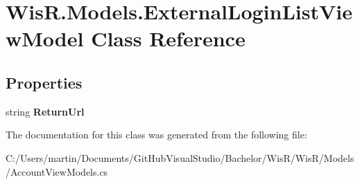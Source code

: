 \hypertarget{class_wis_r_1_1_models_1_1_external_login_list_view_model}{}\section{Wis\+R.\+Models.\+External\+Login\+List\+View\+Model Class Reference}
\label{class_wis_r_1_1_models_1_1_external_login_list_view_model}
\subsection*{Properties}
\begin{DoxyCompactItemize}
\item 
\hypertarget{class_wis_r_1_1_models_1_1_external_login_list_view_model_ad7a9501d79e0f37f9bf59e0d2af85b59}{}string {\bfseries Return\+Url}\label{class_wis_r_1_1_models_1_1_external_login_list_view_model_ad7a9501d79e0f37f9bf59e0d2af85b59}

\end{DoxyCompactItemize}


The documentation for this class was generated from the following file\+:\begin{DoxyCompactItemize}
\item 
C\+:/\+Users/martin/\+Documents/\+Git\+Hub\+Visual\+Studio/\+Bachelor/\+Wis\+R/\+Wis\+R/\+Models/Account\+View\+Models.\+cs\end{DoxyCompactItemize}
